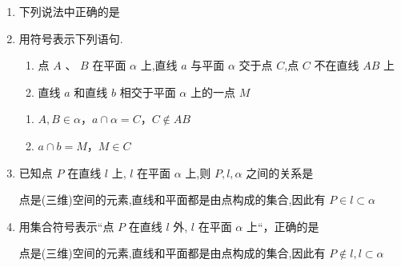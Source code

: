 \begin{enumerate}
    \item 下列说法中正确的是

    \item 用符号表示下列语句.
    \begin{enumerate}
        \item 点 $A$ 、 $B$ 在平面 $\alpha$ 上,直线 $a$ 与平面 $\alpha$ 交于点 $C$,点 $C$ 不在直线 ${AB}$ 上
        \item 直线 $a$ 和直线 $b$ 相交于平面 $\alpha$ 上的一点 $M$
    \end{enumerate}
    \begin{jieda}
        \begin{enumerate}
            \item $A, B \in \alpha$，$a \cap \alpha = C$，$C \notin AB$
            \item $a \cap b = M$，$M \in C$
        \end{enumerate}
    \end{jieda}

    \item 已知点 $P$ 在直线 $l$ 上, $l$ 在平面 $\alpha$ 上,则 $P,l,\alpha$ 之间的关系是
    \begin{jieda}
        点是(三维)空间的元素,直线和平面都是由点构成的集合,因此有 $P \in  l \subset  \alpha$
    \end{jieda}
    \item 用集合符号表示“点 $P$ 在直线 $l$ 外, $l$ 在平面 $\alpha$ 上“，正确的是 
    \begin{jieda}
        点是(三维)空间的元素,直线和平面都是由点构成的集合,因此有 $P \notin  l,l \subset  \alpha$
    \end{jieda}

\end{enumerate}
